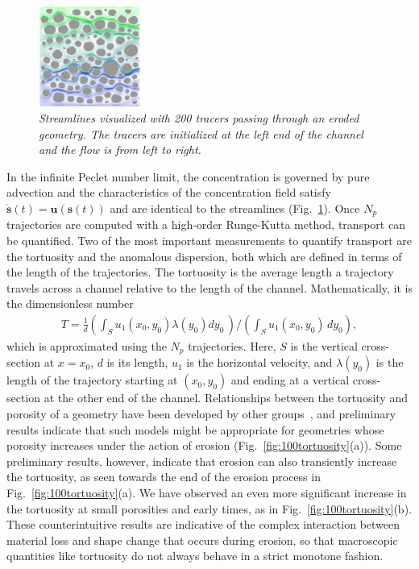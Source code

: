 \documentclass[11pt]{article}
\newcommand{\bvec}[1]{{\mathbf{#1}}}
\newcommand{\uu}{\bvec{u}}
\renewcommand{\ss}{{\mathbf{s}}}
\begin{document}
\begin{figure}
  \includegraphics[width=0.3\textwidth]{figs/100b_t100tracer}
  \caption{\label{fig:100tracers} \em Streamlines visualized with 200 tracers passing through an eroded geometry. The tracers are initialized at the left end of the channel and the flow is from left to right.} \end{figure}
In the infinite Peclet number limit, the concentration is governed by pure advection and the characteristics of the concentration field satisfy $\dot{\ss}(t) = \uu(\ss(t))$ and are identical to the streamlines (Fig.~\ref{fig:100tracers}). Once $N_p$ trajectories are computed with a high-order Runge-Kutta method, transport can be quantified. Two of the most important measurements to quantify transport are the tortuosity and the anomalous dispersion, both which are defined in terms of the length of the trajectories. The tortuosity is the average length a trajectory travels across a channel relative to the length of the channel. Mathematically, it is the dimensionless number 
\begin{align}
  T = \frac{1}{d} \left(\int_{S} u_1(x_0,y_0)\lambda(y_0) dy_0\, \right)
  \Bigg/ \left(\int_S u_1(x_0,y_0)\, dy_0 \right),
\end{align}
which is approximated using the $N_p$ trajectories. Here, $S$ is the
vertical cross-section at $x=x_0$, $d$ is its length, $u_1$ is the
horizontal velocity, and $\lambda(y_0)$ is the length of the trajectory
starting at $(x_0,y_0)$ and ending at a vertical cross-section at the
other end of the channel.  Relationships between the tortuosity and porosity of a geometry have been developed by other groups~\cite{kop-kat-tim1996, dud-koz-mat2011, mat-kha-koz2008}, and preliminary results indicate that such models might be appropriate for geometries whose porosity increases under the action of erosion (Fig.~\ref{fig:100tortuosity}(a)). Some preliminary results, however, indicate that erosion can also transiently increase the tortuosity, as seen towards the end of the erosion process in Fig.~\ref{fig:100tortuosity}(a). We have observed an even more significant increase in the tortuosity at small porosities and early times, as in Fig.~\ref{fig:100tortuosity}(b). These counterintuitive results are indicative of the complex interaction between material loss and shape change that occurs during erosion, so that macroscopic quantities like tortuosity do not always behave in a strict monotone fashion.  
\end{document}
